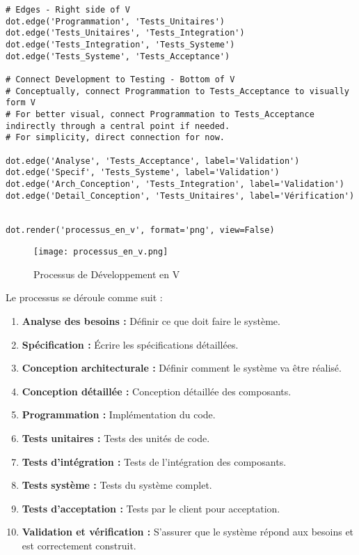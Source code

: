 \documentclass{article}
\begin{document}
\begin{itemize}
\begin{verbatim}
# Edges - Right side of V
dot.edge('Programmation', 'Tests_Unitaires')
dot.edge('Tests_Unitaires', 'Tests_Integration')
dot.edge('Tests_Integration', 'Tests_Systeme')
dot.edge('Tests_Systeme', 'Tests_Acceptance')

# Connect Development to Testing - Bottom of V
# Conceptually, connect Programmation to Tests_Acceptance to visually form V
# For better visual, connect Programmation to Tests_Acceptance indirectly through a central point if needed.
# For simplicity, direct connection for now.

dot.edge('Analyse', 'Tests_Acceptance', label='Validation')
dot.edge('Specif', 'Tests_Systeme', label='Validation')
dot.edge('Arch_Conception', 'Tests_Integration', label='Validation')
dot.edge('Detail_Conception', 'Tests_Unitaires', label='Vérification')


dot.render('processus_en_v', format='png', view=False)
\end{verbatim}

\begin{figure}[H]
    \centering
    \texttt{[image: processus\_en\_v.png]}
    \caption{Processus de Développement en V}
    \label{fig:processus_en_v}
\end{figure}

\noindent Le processus se déroule comme suit :

\begin{enumerate}
    \item \textbf{Analyse des besoins :} Définir ce que doit faire le système.
    \item \textbf{Spécification :}  Écrire les spécifications détaillées.
    \item \textbf{Conception architecturale :} Définir comment le système va être réalisé.
    \item \textbf{Conception détaillée :}  Conception détaillée des composants.
    \item \textbf{Programmation :} Implémentation du code.
    \item \textbf{Tests unitaires :} Tests des unités de code.
    \item \textbf{Tests d'intégration :} Tests de l'intégration des composants.
    \item \textbf{Tests système :} Tests du système complet.
    \item \textbf{Tests d'acceptation :} Tests par le client pour acceptation.
    \item \textbf{Validation et vérification :}  S'assurer que le système répond aux besoins et est correctement construit.
\end{enumerate}


\end{itemize}
\end{document}
